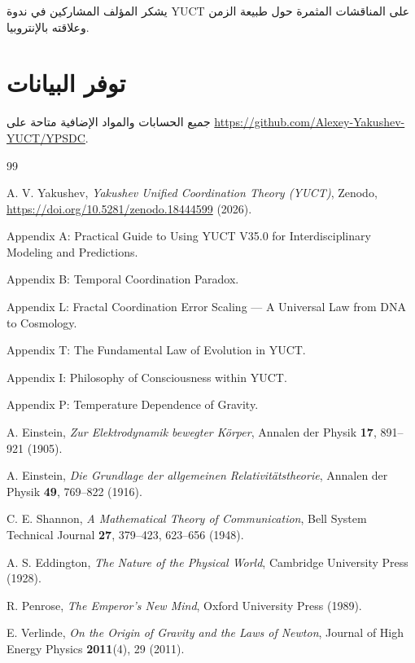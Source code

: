 \documentclass[11pt,a4paper]{article}
\begin{document}
	يشكر المؤلف المشاركين في ندوة YUCT على المناقشات المثمرة حول طبيعة الزمن وعلاقته بالإنتروبيا.
	
	\section*{توفر البيانات}
	
	جميع الحسابات والمواد الإضافية متاحة على \url{https://github.com/Alexey-Yakushev-YUCT/YPSDC}.
	
	\begin{thebibliography}{99}
		
		A. V. Yakushev, \emph{Yakushev Unified Coordination Theory (YUCT)}, Zenodo, \url{https://doi.org/10.5281/zenodo.18444599} (2026).
		
		Appendix A: Practical Guide to Using YUCT V35.0 for Interdisciplinary Modeling and Predictions.
		
		Appendix B: Temporal Coordination Paradox.
		
		Appendix L: Fractal Coordination Error Scaling — A Universal Law from DNA to Cosmology.
		
		Appendix T: The Fundamental Law of Evolution in YUCT.
		
		Appendix I: Philosophy of Consciousness within YUCT.
		
		Appendix P: Temperature Dependence of Gravity.
		
		A. Einstein, \emph{Zur Elektrodynamik bewegter Körper}, Annalen der Physik \textbf{17}, 891–921 (1905).
		
		A. Einstein, \emph{Die Grundlage der allgemeinen Relativitätstheorie}, Annalen der Physik \textbf{49}, 769–822 (1916).
		
		C. E. Shannon, \emph{A Mathematical Theory of Communication}, Bell System Technical Journal \textbf{27}, 379–423, 623–656 (1948).
		
		A. S. Eddington, \emph{The Nature of the Physical World}, Cambridge University Press (1928).
		
		R. Penrose, \emph{The Emperor's New Mind}, Oxford University Press (1989).
		
		E. Verlinde, \emph{On the Origin of Gravity and the Laws of Newton}, Journal of High Energy Physics \textbf{2011}(4), 29 (2011).
		

\end{thebibliography}
\end{document}
